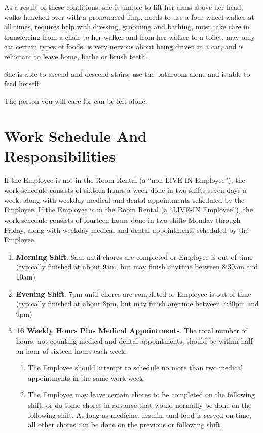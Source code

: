 \documentclass[]{article}
\begin{document}
As a result of these conditions, she is unable to lift her arms above her head, walks hunched over with a pronounced limp, needs to use a four wheel walker at all times, requires help with dressing, grooming and bathing, must take care in transferring from a chair to her walker and from her walker to a toilet, may only eat certain types of foods, is very nervous about being driven in a car, and is reluctant to leave home, bathe or brush teeth.

She is able to ascend and descend stairs, use the bathroom alone and is able to feed herself.

The person you will care for can be left alone.

\section{Work Schedule And Responsibilities}

If the Employee is not in the Room Rental (a ``non-LIVE-IN Employee''), the work schedule consists of sixteen hours a week done in two shifts seven days a week, along with weekday medical and dental appointments scheduled by the Employee. If the Employee is in the Room Rental (a ``LIVE-IN Employee''), the work schedule consists of fourteen hours done in two shifts Monday through Friday, along with weekday medical and dental appointments scheduled by the Employee. 
\begin{enumerate}
	\item \textbf{Morning Shift}. 8am until chores are completed or Employee is out of time (typically finished at about 9am, but may finish anytime between 8:30am and 10am)
	\item \textbf{Evening Shift}. 7pm until chores are completed or Employee is out of time (typically finished at about 8pm, but may finish anytime between 7:30pm and 9pm)
	\item \textbf{16 Weekly Hours Plus Medical Appointments}. The total number of hours, not counting medical and dental appointments, should be within half an hour of sixteen hours each week. 
		\begin{enumerate}
			\item The Employee should attempt to schedule no more than two medical appointments in the same work week.
			\item The Employee may leave certain chores to be completed on the following shift, or do some chores in advance that would normally be done on the following shift. As long as medicine, insulin, and food is served on time, all other chores can be done on the previous or following shift.
		\end{enumerate}
\end{enumerate}
\end{document}
